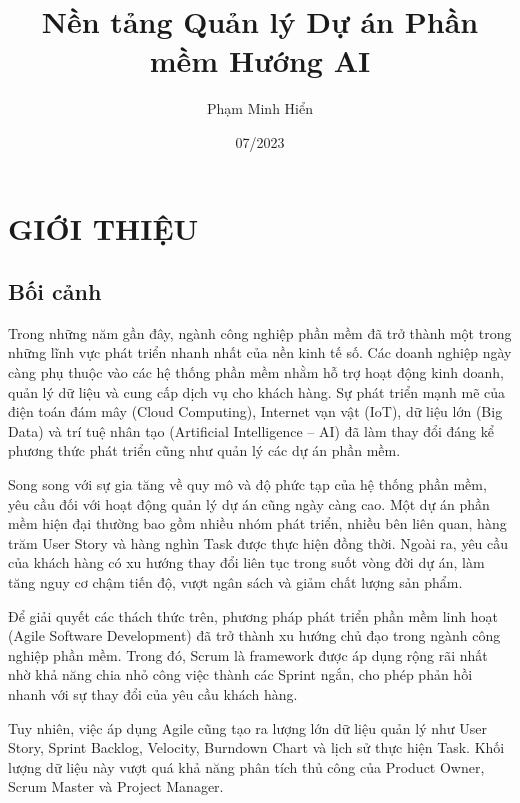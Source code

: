 \documentclass[12pt,a4paper]{report}
\begin{document}
\title{\textbf{Nền tảng Quản lý Dự án Phần mềm Hướng AI}}
\author{Phạm Minh Hiển}
\date{07/2023}
\maketitle

\tableofcontents
\newpage

\listoffigures
\newpage

\listoftables
\newpage

\chapter{GIỚI THIỆU}
\label{chap:introduction}

\section{Bối cảnh}
Trong những năm gần đây, ngành công nghiệp phần mềm đã trở thành một trong những lĩnh vực phát triển nhanh nhất của nền kinh tế số. Các doanh nghiệp ngày càng phụ thuộc vào các hệ thống phần mềm nhằm hỗ trợ hoạt động kinh doanh, quản lý dữ liệu và cung cấp dịch vụ cho khách hàng. Sự phát triển mạnh mẽ của điện toán đám mây (Cloud Computing), Internet vạn vật (IoT), dữ liệu lớn (Big Data) và trí tuệ nhân tạo (Artificial Intelligence -- AI) đã làm thay đổi đáng kể phương thức phát triển cũng như quản lý các dự án phần mềm.

Song song với sự gia tăng về quy mô và độ phức tạp của hệ thống phần mềm, yêu cầu đối với hoạt động quản lý dự án cũng ngày càng cao. Một dự án phần mềm hiện đại thường bao gồm nhiều nhóm phát triển, nhiều bên liên quan, hàng trăm User Story và hàng nghìn Task được thực hiện đồng thời. Ngoài ra, yêu cầu của khách hàng có xu hướng thay đổi liên tục trong suốt vòng đời dự án, làm tăng nguy cơ chậm tiến độ, vượt ngân sách và giảm chất lượng sản phẩm.

Để giải quyết các thách thức trên, phương pháp phát triển phần mềm linh hoạt (Agile Software Development) đã trở thành xu hướng chủ đạo trong ngành công nghiệp phần mềm. Trong đó, Scrum là framework được áp dụng rộng rãi nhất nhờ khả năng chia nhỏ công việc thành các Sprint ngắn, cho phép phản hồi nhanh với sự thay đổi của yêu cầu khách hàng.

Tuy nhiên, việc áp dụng Agile cũng tạo ra lượng lớn dữ liệu quản lý như User Story, Sprint Backlog, Velocity, Burndown Chart và lịch sử thực hiện Task. Khối lượng dữ liệu này vượt quá khả năng phân tích thủ công của Product Owner, Scrum Master và Project Manager.
\end{document}
